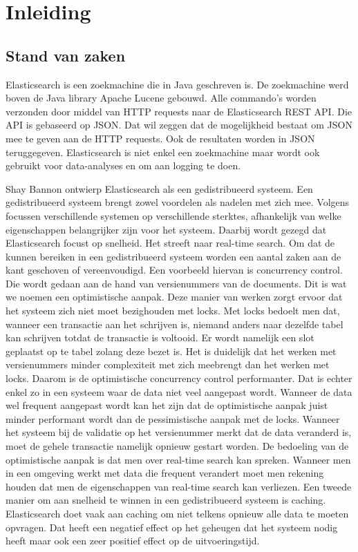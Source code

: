 
\chapter{Inleiding}
\label{ch:inleiding}

\section{Stand van zaken}
\label{sec:stand-van-zaken}

Elasticsearch is een zoekmachine die in Java geschreven is. De zoekmachine werd boven de Java library Apache Lucene gebouwd. Alle commando's worden verzonden door middel van HTTP requests naar de Elasticsearch REST API. Die API is gebaseerd op JSON. Dat wil zeggen dat de mogelijkheid bestaat om JSON mee te geven aan de HTTP requests. Ook de resultaten worden in JSON teruggegeven. Elasticsearch is niet enkel een zoekmachine maar wordt ook gebruikt voor data-analyses en om aan logging te doen. 

Shay Bannon ontwierp Elasticsearch als een gedistribueerd systeem. Een gedistribueerd systeem brengt zowel voordelen als nadelen met zich mee. Volgens \textcite{Brasetvik2013} focussen verschillende systemen op verschillende sterktes, afhankelijk van welke eigenschappen belangrijker zijn voor het systeem. Daarbij wordt gezegd dat Elasticsearch focust op snelheid. Het streeft naar real-time search. Om dat de kunnen bereiken in een gedistribueerd systeem worden een aantal zaken aan de kant geschoven of vereenvoudigd. Een voorbeeld hiervan is concurrency control. Die wordt gedaan aan de hand van versienummers van de documents. Dit is wat we noemen een optimistische aanpak. Deze manier van werken zorgt ervoor dat het systeem zich niet moet bezighouden met locks. Met locks bedoelt men dat, wanneer een transactie aan het schrijven is, niemand anders naar dezelfde tabel kan schrijven totdat de transactie is voltooid. Er wordt namelijk een slot geplaatst op te tabel zolang deze bezet is. Het is duidelijk dat het werken met versienummers minder complexiteit met zich meebrengt dan het werken met locks. Daarom is de optimistische concurrency control performanter. Dat is echter enkel zo in een systeem waar de data niet veel aangepast wordt. Wanneer de data wel frequent aangepast wordt kan het zijn dat de optimistische aanpak juist minder performant wordt dan de pessimistische aanpak met de locks. Wanneer het systeem bij de validatie op het versienummer merkt dat de data veranderd is, moet de gehele transactie namelijk opnieuw gestart worden. De bedoeling van de optimistische aanpak is dat men over real-time search kan spreken. Wanneer men in een omgeving werkt met data die frequent verandert moet men rekening houden dat men de eigenschappen van real-time search kan verliezen. Een tweede manier om aan snelheid te winnen in een gedistribueerd systeem is caching. Elasticsearch doet vaak aan caching om niet telkens opnieuw alle data te moeten opvragen. Dat heeft een negatief effect op het geheugen dat het systeem nodig heeft maar ook een zeer positief effect op de uitvoeringstijd.

